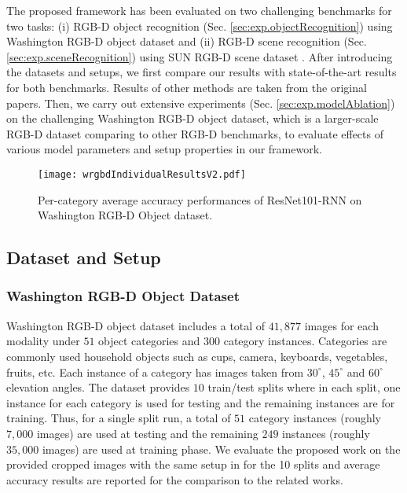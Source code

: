 The proposed framework has been evaluated on two challenging benchmarks for two tasks: (i) RGB-D object recognition (Sec. \ref{sec:exp.objectRecognition}) using Washington RGB-D object dataset \citep{Lai_ICRA_2011} and (ii) RGB-D scene recognition (Sec. \ref{sec:exp.sceneRecognition}) using SUN RGB-D scene dataset \citep{Song_CVPR_2015}. After introducing the datasets and setups, we first compare our results with state-of-the-art results for both benchmarks. Results of other methods are taken from the original papers. Then, we carry out extensive experiments (Sec. \ref{sec:exp.modelAblation}) on the challenging Washington RGB-D object dataset, which is a larger-scale RGB-D dataset comparing to other RGB-D benchmarks, to evaluate effects of various model parameters and setup properties in our framework.
\begin{figure*}[!ht]
	\begin{center}
		\texttt{[image: wrgbdIndividualResultsV2.pdf]}
	\end{center}
	\caption{Per-category average accuracy performances of ResNet101-RNN on Washington RGB-D Object dataset.}
	\label{fig:wrgbdIndividualResults}
\end{figure*}
\subsection{Dataset and Setup} \label{sec:exp.datasets}
\subsubsection{Washington RGB-D Object Dataset}
Washington RGB-D object dataset includes a total of $41,877$ images for each modality under $51$ object categories and $300$ category instances. Categories are commonly used household objects such as cups, camera, keyboards, vegetables, fruits, etc. Each instance of a category has images taken from $30^\circ$, $45^\circ$ and $60^\circ$ elevation angles. The dataset provides $10$ train/test splits where in each split, one instance for each category is used for testing and the remaining instances are for training. Thus, for a single split run, a total of $51$ category instances (roughly $7,000$ images) are used at testing and the remaining $249$ instances (roughly $35,000$ images) are used at training phase. We evaluate the proposed work on the provided cropped images with the same setup in \cite{Lai_ICRA_2011} for the 10 splits and average accuracy results are reported for the comparison to the related works.
